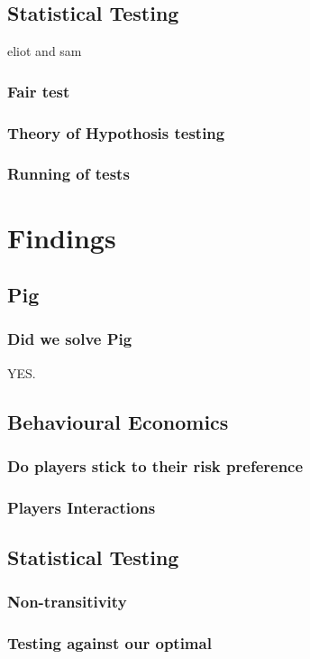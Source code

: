\documentclass[a4paper,titlepage]{article}
\begin{document}
\subsection{Statistical Testing}
eliot and sam
\subsubsection{Fair test}
\subsubsection{Theory of Hypothosis testing}
\subsubsection{Running of tests}


\section{Findings}
\subsection{Pig}
\subsubsection{Did we solve Pig}
{\tiny YES.}

\subsection{Behavioural Economics}
\subsubsection{Do players stick to their risk preference}
\subsubsection{Players Interactions}

\subsection{Statistical Testing}
\subsubsection{Non-transitivity}
\subsubsection{Testing against our optimal}
\end{document}
